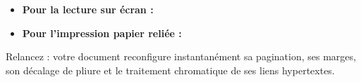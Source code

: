 \begin{itemize}
  \item \textbf{Pour la lecture sur écran :}
  \begin{center}
  \end{center}
  \item \textbf{Pour l'impression papier reliée :}
  \begin{center}
  \end{center}
\end{itemize}
Relancez  : votre document reconfigure instantanément sa pagination, ses marges,
son décalage de pliure  et le traitement chromatique de ses liens hypertextes.
